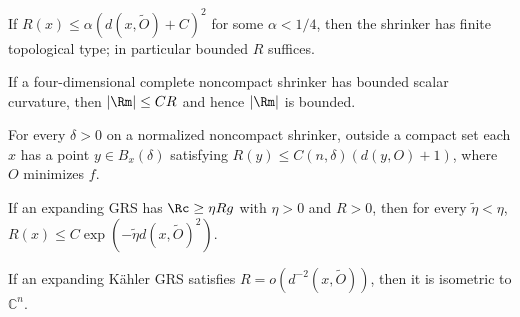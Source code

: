 \begin{corollary}
\label{cor:chow-iv-finite-topological-type}
If $R(x)\le\alpha(d(x,\widetilde O)+C)^2$ for some $\alpha<1/4$, then the
shrinker has finite topological type; in particular bounded $R$ suffices.
\end{corollary}

\begin{theorem}
\label{thm:chow-iv-four-dimensional-curvature}
If a four-dimensional complete noncompact shrinker has bounded scalar curvature,
then $|\Rm|\le C R$ and hence $|\Rm|$ is bounded.
\end{theorem}

\begin{lemma}
\label{lem:chow-iv-linear-net-scalar}
For every $\delta>0$ on a normalized noncompact shrinker, outside a compact set
each $x$ has a point $y\in B_x(\delta)$ satisfying
$R(y)\le C(n,\delta)(d(y,O)+1)$, where $O$ minimizes $f$.
\end{lemma}

\begin{proposition}
\label{prop:chow-iv-expander-curvature-decay}
If an expanding GRS has $\Rc\ge\eta Rg$ with $\eta>0$ and $R>0$, then for
every $\widetilde\eta<\eta$,
$R(x)\le C\exp(-\widetilde\eta d(x,\widetilde O)^2)$.
\end{proposition}

\begin{theorem}
\label{thm:chow-iv-kahler-expander-rigidity}
If an expanding K\"ahler GRS satisfies $R=o(d^{-2}(x,\widetilde O))$, then it is
isometric to $\mathbb C^n$.
\end{theorem}

